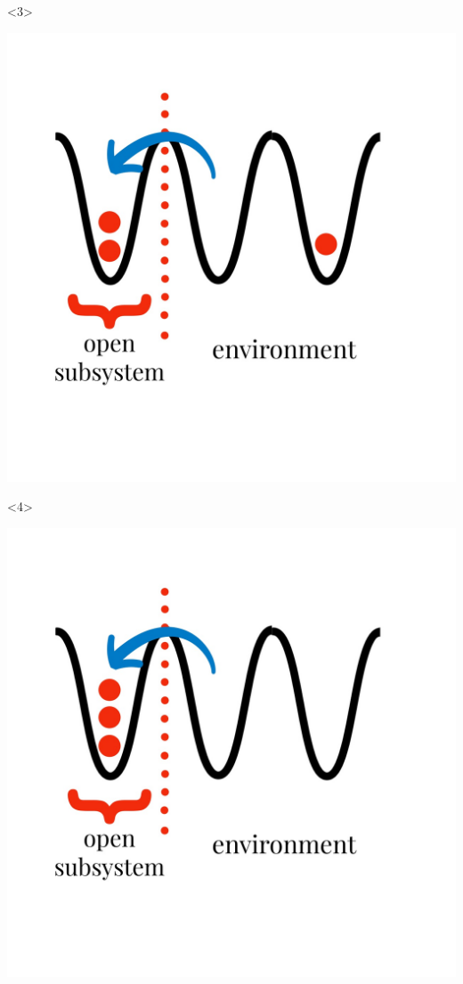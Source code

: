 \documentclass[aspectratio=169]{beamer}
\begin{document}
\begin{frame}
\begin{onlyenv}
\begin{center}
    \end{center}
  \end{onlyenv}
  \begin{onlyenv}<3>
    \begin{center}
      \includegraphics[scale=0.17]{../img/constraints3.jpeg}
    \end{center}
  \end{onlyenv}
  \begin{onlyenv}<4>
    \begin{center}
      \includegraphics[scale=0.17]{../img/constraints4.jpeg}
    \end{center}
  \end{onlyenv}
\end{frame}
\end{document}
